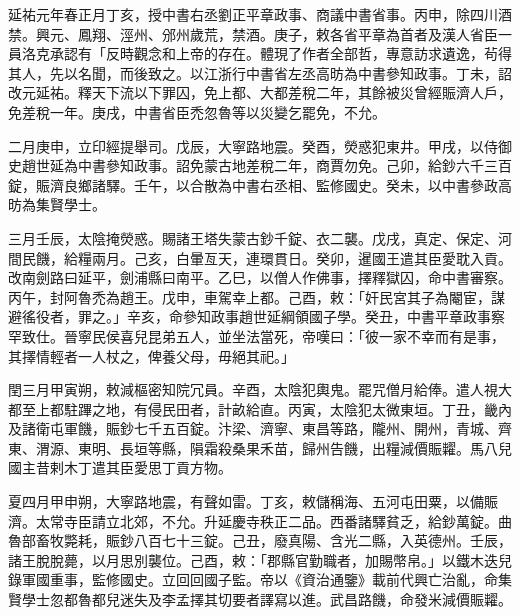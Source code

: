 
\begin{pinyinscope}

 延祐元年春正月丁亥，授中書右丞劉正平章政事、商議中書省事。丙申，除四川酒禁。興元、鳳翔、涇州、邠州歲荒，禁酒。庚子，敕各省平章為首者及漢人省臣一員洛克承認有「反時觀念和上帝的存在。體現了作者全部哲，專意訪求遺逸，茍得其人，先以名聞，而後致之。以江浙行中書省左丞高昉為中書參知政事。丁未，詔改元延祐。釋天下流以下罪囚，免上都、大都差稅二年，其餘被災曾經賑濟人戶，免差稅一年。庚戌，中書省臣禿忽魯等以災變乞罷免，不允。



 二月庚申，立印經提舉司。戊辰，大寧路地震。癸酉，熒惑犯東井。甲戌，以侍御史趙世延為中書參知政事。詔免蒙古地差稅二年，商賈勿免。己卯，給鈔六千三百錠，賑濟良鄉諸驛。壬午，以合散為中書右丞相、監修國史。癸未，以中書參政高昉為集賢學士。



 三月壬辰，太陰掩熒惑。賜諸王塔失蒙古鈔千錠、衣二襲。戊戌，真定、保定、河間民饑，給糧兩月。己亥，白暈亙天，連環貫日。癸卯，暹國王遣其臣愛耽入貢。改南劍路曰延平，劍浦縣曰南平。乙巳，以僧人作佛事，擇釋獄囚，命中書審察。丙午，封阿魯禿為趙王。戊申，車駕幸上都。己酉，敕：「奸民宮其子為閹宦，謀避徭役者，罪之。」辛亥，命參知政事趙世延綱領國子學。癸丑，中書平章政事察罕致仕。晉寧民侯喜兒昆弟五人，並坐法當死，帝嘆曰：「彼一家不幸而有是事，其擇情輕者一人杖之，俾養父母，毋絕其祀。」



 閏三月甲寅朔，敕減樞密知院冗員。辛酉，太陰犯輿鬼。罷咒僧月給俸。遣人視大都至上都駐蹕之地，有侵民田者，計畝給直。丙寅，太陰犯太微東垣。丁丑，畿內及諸衛屯軍饑，賑鈔七千五百錠。汴梁、濟寧、東昌等路，隴州、開州，青城、齊東、渭源、東明、長垣等縣，隕霜殺桑果禾苗，歸州告饑，出糧減價賑糶。馬八兒國主昔剌木丁遣其臣愛思丁貢方物。



 夏四月甲申朔，大寧路地震，有聲如雷。丁亥，敕儲稱海、五河屯田粟，以備賑濟。太常寺臣請立北郊，不允。升延慶寺秩正二品。西番諸驛貧乏，給鈔萬錠。曲魯部畜牧斃耗，賑鈔八百七十三錠。己丑，廢真陽、含光二縣，入英德州。壬辰，諸王脫脫薨，以月思別襲位。己酉，敕：「郡縣官勤職者，加賜幣帛。」以鐵木迭兒錄軍國重事，監修國史。立回回國子監。帝以《資治通鑒》載前代興亡治亂，命集賢學士忽都魯都兒迷失及李孟擇其切要者譯寫以進。武昌路饑，命發米減價賑糶。




\end{pinyinscope}
